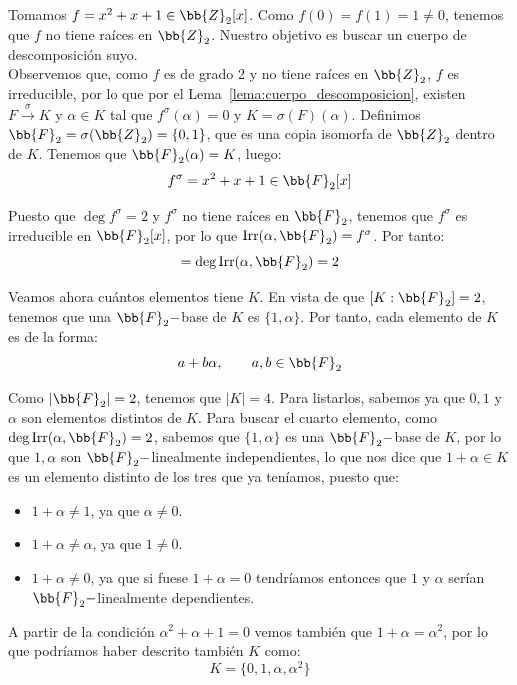 \begin{ejemplo}
    Tomamos $f = x^2+x+1\in \bb{Z}_2[x]$. Como $f(0) = f(1) = 1 \neq 0$, tenemos que $f$ no tiene raíces en $\bb{Z}_2$. Nuestro objetivo es buscar un cuerpo de descomposición suyo.\\

    \noindent
    Observemos que, como $f$ es de grado 2 y no tiene raíces en $\bb{Z}_2$, $f$ es irreducible, por lo que 
    por el Lema~\ref{lema:cuerpo_descomposicion}, existen $F\stackrel{\sigma}{\to}K$ y $\alpha\in K$ tal que $f^\sigma(\alpha) = 0$ y $K = \sigma(F)(\alpha)$. Definimos $\bb{F}_2 = \sigma(\bb{Z}_2)=\{0,1\}$, que es una copia isomorfa de $\bb{Z}_2$ dentro de $K$. Tenemos que $\bb{F}_2(\alpha)= K$, luego:
    \begin{equation*}
        f^\sigma = x^2+x+1 \in \bb{F}_2[x]
    \end{equation*}

    Puesto que $\deg f^\sigma = 2$ y $f^\sigma$ no tiene raíces en $\bb{F}_2$, tenemos que $f^\sigma$ es irreducible en $\bb{F}_2[x]$, por lo que $\Irr(\alpha,\bb{F}_2) = f^\sigma$. Por tanto:
    \begin{equation*}
        [K:\bb{F}_2] = \deg \Irr(\alpha,\bb{F}_2) = 2
    \end{equation*}

    Veamos ahora cuántos elementos tiene $K$. En vista de que $[K:\bb{F}_2] = 2$, tenemos que una $\bb{F}_2-$base de $K$ es $\{1,\alpha\}$. Por tanto, cada elemento de $K$ es de la forma:
    \begin{equation*}
        a + b\alpha, \qquad a,b\in \bb{F}_2
    \end{equation*}    
    
    Como $|\bb{F}_2| = 2$, tenemos que $|K| = 4$. Para listarlos, sabemos ya que $0,1$ y $\alpha$ son elementos distintos de $K$. Para buscar el cuarto elemento, como $\deg\Irr(\alpha,\bb{F}_2) = 2$, sabemos que $\{1,\alpha\}$ es una $\bb{F}_2-$base de $K$, por lo que $1,\alpha$ son $\bb{F}_2-$linealmente independientes, lo que nos dice que $1+\alpha\in K$ es un elemento distinto de los tres que ya teníamos, puesto que:
    \begin{itemize}
        \item $1+\alpha\neq 1$, ya que $\alpha \neq 0$.
        \item $1+\alpha\neq \alpha$, ya que $1 \neq 0$.
        \item $1+\alpha\neq 0$, ya que si fuese $1+\alpha = 0$ tendríamos entonces que $1$ y $\alpha$ serían $\bb{F}_2-$linealmente dependientes.
    \end{itemize}
    A partir de la condición $\alpha^2 + \alpha + 1 = 0$ vemos también que $1+\alpha = \alpha^2$, por lo que podríamos haber descrito también $K$ como:
    \begin{equation*}
        K = \{0,1,\alpha,\alpha^2\}
    \end{equation*}


\end{ejemplo}
